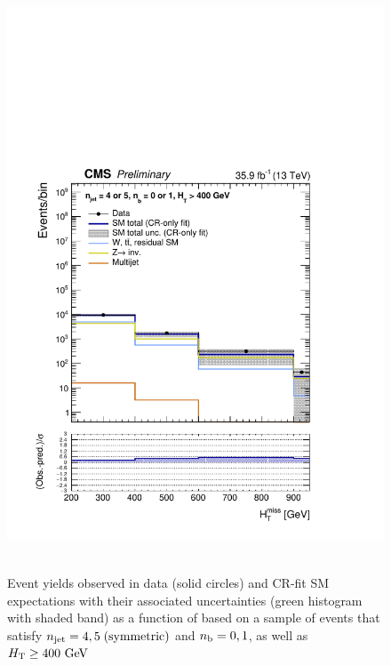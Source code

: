 \clearpage
\begin{figure}[h!]
  \centering
  \caption{Event yields observed in data (solid circles) and CR-fit SM expectations with their associated uncertainties 
  (green histogram with shaded band) as a function of \HTmiss based on a sample of events that satisfy 
  $n_{\text{jet}} = 4, 5 \; \textrm{(symmetric)}$ and $n_{\text{b}} = 0, 1$, as well as $\mbox{$H_\text{T}$} \geq 400 \textrm{ GeV}$ }
  \includegraphics[width=0.8\linewidth]{figures/results/36invfb_preapproval/aggregated/postFitShapeCR/mhtShape_eq01b_eq45j_400_Inf_crfit.pdf} ~
\end{figure}

